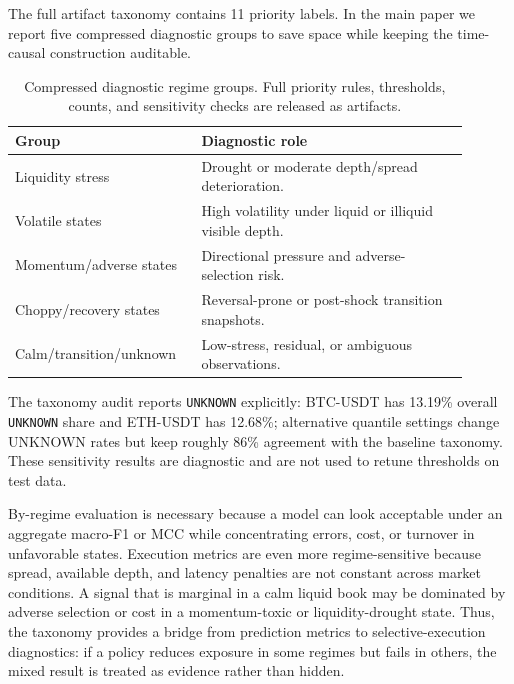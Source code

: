 \documentclass[conference]{IEEEtran}
\begin{document}
The full artifact taxonomy contains 11 priority labels. In the main paper we report five compressed diagnostic groups to save space while keeping the time-causal construction auditable.

\begin{table}[t]
\centering
\caption{Compressed diagnostic regime groups. Full priority rules, thresholds, counts, and sensitivity checks are released as artifacts.}
\label{tab:regime_taxonomy}
\scriptsize
\begin{tabular}{p{0.35\linewidth}p{0.55\linewidth}}
\toprule
Group & Diagnostic role \\
\midrule
Liquidity stress & Drought or moderate depth/spread deterioration. \\
Volatile states & High volatility under liquid or illiquid visible depth. \\
Momentum/adverse states & Directional pressure and adverse-selection risk. \\
Choppy/recovery states & Reversal-prone or post-shock transition snapshots. \\
Calm/transition/unknown & Low-stress, residual, or ambiguous observations. \\
\bottomrule
\end{tabular}
\end{table}

The taxonomy audit reports \texttt{UNKNOWN} explicitly: BTC-USDT has 13.19\% overall \texttt{UNKNOWN} share and ETH-USDT has 12.68\%; alternative quantile settings change UNKNOWN rates but keep roughly 86\% agreement with the baseline taxonomy. These sensitivity results are diagnostic and are not used to retune thresholds on test data.

By-regime evaluation is necessary because a model can look acceptable under an aggregate macro-F1 or MCC while concentrating errors, cost, or turnover in unfavorable states. Execution metrics are even more regime-sensitive because spread, available depth, and latency penalties are not constant across market conditions. A signal that is marginal in a calm liquid book may be dominated by adverse selection or cost in a momentum-toxic or liquidity-drought state. Thus, the taxonomy provides a bridge from prediction metrics to selective-execution diagnostics: if a policy reduces exposure in some regimes but fails in others, the mixed result is treated as evidence rather than hidden.
\end{document}
